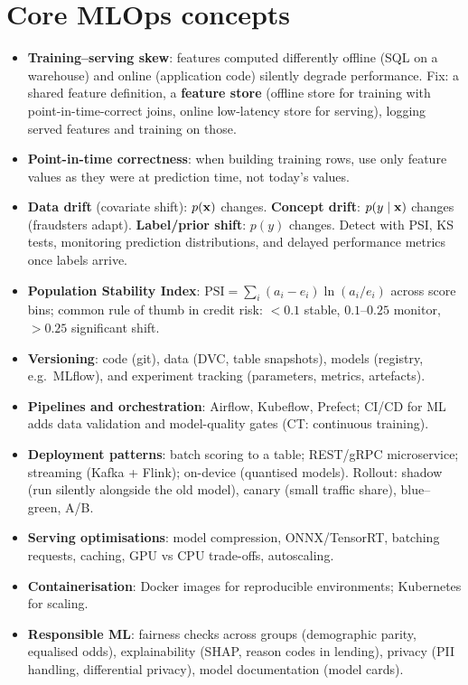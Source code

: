 \section{Core MLOps concepts}
\begin{itemize}
  \item \textbf{Training--serving skew}: features computed differently offline (SQL on a warehouse) and online (application code) silently degrade performance. Fix: a shared feature definition, a \textbf{feature store} (offline store for training with point-in-time-correct joins, online low-latency store for serving), logging served features and training on those.
  \item \textbf{Point-in-time correctness}: when building training rows, use only feature values as they were at prediction time, not today's values.
  \item \textbf{Data drift} (covariate shift): $p(\mathbf{x})$ changes. \textbf{Concept drift}: $p(y\mid\mathbf{x})$ changes (fraudsters adapt). \textbf{Label/prior shift}: $p(y)$ changes. Detect with PSI, KS tests, monitoring prediction distributions, and delayed performance metrics once labels arrive.
  \item \textbf{Population Stability Index}: $\text{PSI}=\sum_i(a_i-e_i)\ln(a_i/e_i)$ across score bins; common rule of thumb in credit risk: $<0.1$ stable, $0.1$--$0.25$ monitor, $>0.25$ significant shift.
  \item \textbf{Versioning}: code (git), data (DVC, table snapshots), models (registry, e.g.\ MLflow), and experiment tracking (parameters, metrics, artefacts).
  \item \textbf{Pipelines and orchestration}: Airflow, Kubeflow, Prefect; CI/CD for ML adds data validation and model-quality gates (CT: continuous training).
  \item \textbf{Deployment patterns}: batch scoring to a table; REST/gRPC microservice; streaming (Kafka + Flink); on-device (quantised models). Rollout: shadow (run silently alongside the old model), canary (small traffic share), blue--green, A/B.
  \item \textbf{Serving optimisations}: model compression, ONNX/TensorRT, batching requests, caching, GPU vs CPU trade-offs, autoscaling.
  \item \textbf{Containerisation}: Docker images for reproducible environments; Kubernetes for scaling.
  \item \textbf{Responsible ML}: fairness checks across groups (demographic parity, equalised odds), explainability (SHAP, reason codes in lending), privacy (PII handling, differential privacy), model documentation (model cards).
\end{itemize}

